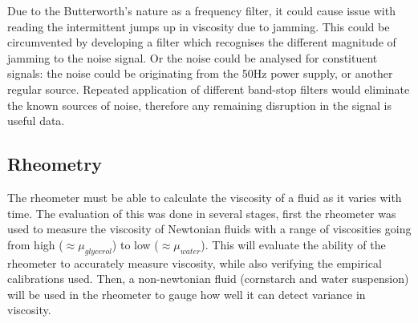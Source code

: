 \documentclass[twoside,a4]{report}
\def\br{\newline \newline \noindent}
\begin{document}
    \noindent
	Due to the Butterworth's nature as a frequency filter, it could cause issue with reading the intermittent jumps up in viscosity due to jamming. This could be circumvented by developing a filter which recognises the different magnitude of jamming to the noise signal. Or the noise could be analysed for constituent signals: the noise could be originating from the 50Hz power supply, or another regular source. Repeated application of different band-stop filters would eliminate the known sources of noise, therefore any remaining disruption in the signal is useful data.

	\subsection*{Rheometry}
	The rheometer must be able to calculate the viscosity of a fluid as it varies with time. The evaluation of this was done in several stages, first the rheometer was used to measure the viscosity of Newtonian fluids with a range of viscosities going from high (\(\approx \mu_{glycerol}\)) to low ($\approx \mu_{water}$). This will evaluate the ability of the rheometer to accurately measure viscosity, while also verifying the empirical calibrations used. Then, a non-newtonian fluid (cornstarch and water suspension) will be used in the rheometer to gauge how well it can detect variance in viscosity.\br
	
	
\end{document}
